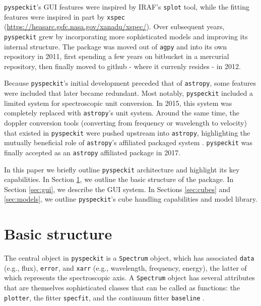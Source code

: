 \documentclass[twocolumn]{aastex62}
\newcommand{\pyspeckit}{\texttt{pyspeckit}\xspace}
\newcommand{\astropy}{\texttt{astropy}\xspace}
\begin{document}
\pyspeckit's GUI features were inspired by IRAF's \texttt{splot} tool, while
the fitting features were inspired in part by \texttt{xspec}
(\url{https://heasarc.gsfc.nasa.gov/xanadu/xspec/}).  Over subsequent years,
\pyspeckit grew by incorporating more sophisticated models and improving its
internal structure.  
The package was moved out of \texttt{agpy} and into its
own repository in 2011, first spending a few years on bitbucket in a mercurial
repository, then finally moved to github - where it currenly resides - in 2012.

Because \pyspeckit's initial development preceded that of \astropy, some features
were included that later became redundant.  Most notably, \pyspeckit included
a limited system for spectroscopic unit conversion.  In 2015, this system
was completely replaced with \astropy's unit system.  Around the same time,
the doppler conversion tools (converting from frequency or wavelength to 
velocity) that existed in \pyspeckit were pushed upstream into \astropy,
highlighting the mutually beneficial role of \astropy's affiliated
packaged system \citep{Price-Whelan2018a}.  \pyspeckit was finally
accepted as an \astropy affiliated package in 2017.


In this paper we briefly outline \texttt{pyspeckit} architecture and highlight
its key capabilities. In Section \ref{sec:basicstructure}, we  outline the
basic structure of the package.  In Section \ref{sec:gui}, we describe the GUI
system.  In Sections \ref{sec:cubes} and \ref{sec:models}, we outline
\pyspeckit's cube handling capabilities and model library. 



\section{Basic structure}
\label{sec:basicstructure}
The central object in \pyspeckit is a \texttt{Spectrum} object, which has
associated \texttt{data} (e.g., flux), \texttt{error}, and \texttt{xarr} (e.g., wavelength,
frequency, energy), the latter of
which represents the spectroscopic axis.  A \texttt{Spectrum} object has
several attributes that are themselves sophisticated classes that can be called
as functions: the \texttt{plotter}, the fitter \texttt{specfit}, and the
continuum fitter \texttt{baseline}
.
\end{document}
